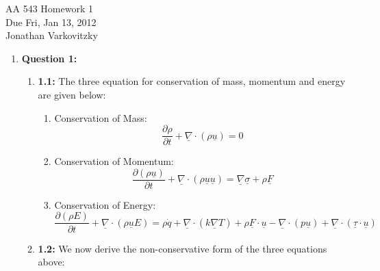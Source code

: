 \documentclass{article}
\begin{document}
\begin{center}
AA 543 Homework 1  \\
Due Fri, Jan 13, 2012 \\
Jonathan Varkovitzky
\end{center}

\newcommand{\ul}{\underline}
\newcommand{\p}{\partial}


\begin{enumerate}
\item \textbf{Question 1:}
\begin{enumerate}
\item \textbf{1.1:}
The three equation for conservation of mass, momentum and energy are given below:

\begin{enumerate}
\item Conservation of Mass:
\begin{equation}
\boxed{\frac{\partial \rho}{\partial t} + \underline{\nabla}\cdot(\rho \underline{u}) = 0}
\end{equation}

\item Conservation of Momentum:
\begin{equation}
\boxed{\frac{\partial(\rho\underline{u})}{\partial t} + \underline{\nabla}\cdot(\rho \underline{u}\underline{u}) = \underline{\nabla}\underline{\sigma}+\rho \underline{F} }
\end{equation}

\item Conservation of Energy:
\begin{equation}
\boxed{\frac{\partial(\rho E)}{\partial t} + \underline{\nabla}\cdot(\rho\underline{u}E)=\rho \dot{q}+\underline{\nabla}\cdot(k\underline{\nabla}T)+\rho\underline{F}\cdot\underline{u}-\underline{\nabla} \cdot (p \underline{u})+\underline{\nabla}\cdot(\underline{\tau}\cdot\underline{u})}
\end{equation}
\end{enumerate}
\item \textbf{1.2:}
We now derive the non-conservative form of the three equations above:

\begin{enumerate}


\end{enumerate}
\end{enumerate}
\end{enumerate}
\end{document}
